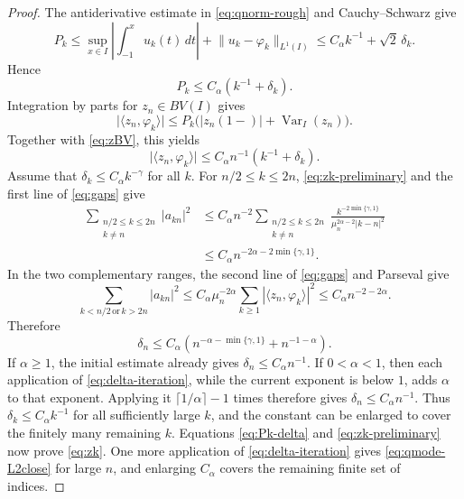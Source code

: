\documentclass[11pt]{amsart}
\numberwithin{equation}{section}
\theoremstyle{remark}
\newcommand{\norm}[2][]{\lVert #2\rVert_{#1}}
\newcommand{\abs}[1]{\lvert #1\rvert}
\newcommand{\ip}[2]{\langle #1,#2\rangle}
\newcommand{\Var}{\operatorname{Var}}
\begin{document}
\begin{proof}
The antiderivative estimate in \eqref{eq:qnorm-rough} and Cauchy--Schwarz give
\[
 P_k\le \sup_{x\in I}\left|\int_{-1}^x u_k(t)\,dt\right|
 +\norm[L^1(I)]{u_k-\varphi_k}
 \le C_\alpha k^{-1}+\sqrt2\,\delta_k.
\]
Hence
\begin{equation}\label{eq:Pk-delta}
 P_k\le C_\alpha(k^{-1}+\delta_k).
\end{equation}
Integration by parts for $z_n\in BV(I)$ gives
\[
 \abs{\ip{z_n}{\varphi_k}}
 \le P_k\bigl(\abs{z_n(1-)}+\Var_I(z_n)\bigr).
\]
Together with \eqref{eq:zBV}, this yields
\begin{equation}\label{eq:zk-preliminary}
 \abs{\ip{z_n}{\varphi_k}}
 \le C_\alpha n^{-1}(k^{-1}+\delta_k).
\end{equation}
Assume that $\delta_k\le C_\alpha k^{-\gamma}$ for all $k$.  For
$n/2\le k\le2n$, \eqref{eq:zk-preliminary} and the first line of
\eqref{eq:gaps} give
\[
 \begin{aligned}
 \sum_{\substack{n/2\le k\le2n\\k\ne n}}|a_{kn}|^2
 &\le C_\alpha n^{-2}
 \sum_{\substack{n/2\le k\le2n\\k\ne n}}
 \frac{k^{-2\min\{\gamma,1\}}}
 {\mu_n^{2\alpha-2}|k-n|^2}\\
 &\le C_\alpha n^{-2\alpha-2\min\{\gamma,1\}}.
 \end{aligned}
\]
In the two complementary ranges, the second line of \eqref{eq:gaps} and
Parseval give
\[
 \sum_{k<n/2\,\text{or}\,k>2n}|a_{kn}|^2
 \le C_\alpha\mu_n^{-2\alpha}
 \sum_{k\ge1}|\ip{z_n}{\varphi_k}|^2
 \le C_\alpha n^{-2-2\alpha}.
\]
Therefore
\begin{equation}\label{eq:delta-iteration}
 \delta_n\le C_\alpha\left(
 n^{-\alpha-\min\{\gamma,1\}}+n^{-1-\alpha}\right).
\end{equation}
If $\alpha\ge1$, the initial estimate already gives
$\delta_n\le C_\alpha n^{-1}$.  If $0<\alpha<1$, then each application
of \eqref{eq:delta-iteration}, while the current exponent is below $1$,
adds $\alpha$ to that exponent.  Applying it
$\lceil1/\alpha\rceil-1$ times therefore gives
$\delta_n\le C_\alpha n^{-1}$.  Thus
$\delta_k\le C_\alpha k^{-1}$ for all sufficiently large $k$, and the
constant can be enlarged to cover the finitely many remaining $k$.
Equations \eqref{eq:Pk-delta} and \eqref{eq:zk-preliminary} now prove
\eqref{eq:zk}.  One more application of \eqref{eq:delta-iteration} gives
\eqref{eq:qmode-L2close} for large $n$, and enlarging $C_\alpha$ covers the
remaining finite set of indices.

\medskip

\end{proof}
\end{document}
